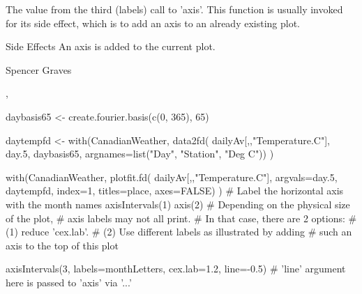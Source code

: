 \documentclass{article}
\begin{document}
\begin{Value}
The value from the third (labels) call to 'axis'.  This function is
usually invoked for its side effect, which is to add an axis to an
already existing plot.
\end{Value}
\begin{Section}{Side Effects}
An axis is added to the current plot.
\end{Section}
\begin{Author}\relax
Spencer Graves
\end{Author}
\begin{SeeAlso}\relax
{}, 
\end{SeeAlso}
\begin{Examples}
\begin{ExampleCode}
daybasis65 <- create.fourier.basis(c(0, 365), 65)

daytempfd <- with(CanadianWeather, data2fd(
       dailyAv[,,"Temperature.C"], day.5,
       daybasis65, argnames=list("Day", "Station", "Deg C")) )
 
with(CanadianWeather, plotfit.fd(
      dailyAv[,,"Temperature.C"], argvals=day.5,
          daytempfd, index=1, titles=place, axes=FALSE) )
# Label the horizontal axis with the month names
axisIntervals(1) 
axis(2)
# Depending on the physical size of the plot,
# axis labels may not all print.
# In that case, there are 2 options:
# (1) reduce 'cex.lab'.
# (2) Use different labels as illustrated by adding
#     such an axis to the top of this plot 

axisIntervals(3, labels=monthLetters, cex.lab=1.2, line=-0.5) 
# 'line' argument here is passed to 'axis' via '...' 

\end{ExampleCode}
\end{Examples}
\end{document}
